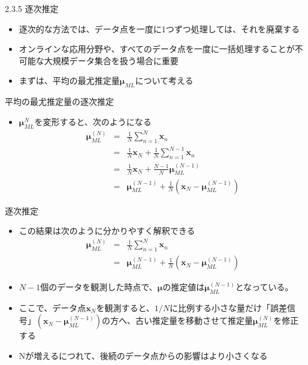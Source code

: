 \begin{frame}{2.3.5 逐次推定}
 \begin{itemize}
  \item 逐次的な方法では、データ点を一度に1つずつ処理しては、それを廃棄する
  \item オンラインな応用分野や、すべてのデータ点を一度に一括処理することが不可能な大規模データ集合を扱う場合に重要
  \item まずは、平均の最尤推定量$\bm{\mu}_{ML}$について考える
 \end{itemize}
\end{frame}

\begin{frame}{平均の最尤推定量の逐次推定}
 \begin{itemize}
  \item $\bm{\mu}_{ML}^{N}$を変形すると、次のようになる
        \begin{eqnarray}
         \bm{\mu}_{ML}^{(N)} &= &\frac{1}{N}\sum_{n=1}^{N}\bm{x}_n \nonumber \\
         & =& \frac{1}{N}\bm{x}_N+\frac{1}{N}\sum_{n=1}^{N-1}\bm{x}_n \nonumber \\
         & =& \frac{1}{N}\bm{x}_N + \frac{N-1}{N}\bm{\mu}_{ML}^{(N-1)}\nonumber \\
         & =& \bm{\mu}_{ML}^{(N-1)} +\frac{1}{N} (\bm{x}_N-\bm{\mu}_{ML}^{(N-1)})\label{162008_21Nov14}
        \end{eqnarray}
 \end{itemize}
\end{frame}

\begin{frame}{逐次推定}
 \begin{itemize}
  \item この結果は次のように分かりやすく解釈できる
        \begin{eqnarray}
         \bm{\mu}_{ML}^{(N)} &= &\frac{1}{N}\sum_{n=1}^{N}\bm{x}_n \\
         & =& \bm{\mu}_{ML}^{(N-1)} +\frac{1}{N} (\bm{x}_N-\bm{\mu}_{ML}^{(N-1)})
        \end{eqnarray}
  \item $N-1$個のデータを観測した時点で、$\bm{\mu}$の推定値は$\bm{\mu}_{ML}^{(N-1)}$となっている。
  \item ここで、データ点$\bm{x}_N$を観測すると、$1/N$に比例する小さな量だけ「誤差信号」$(\bm{x}_N-\bm{\mu}_{ML}^{(N-1)})$の方へ、古い推定量を移動させて推定量$\bm{\mu}_{ML}^{(N)}$を修正する
  \item Nが増えるにつれて、後続のデータ点からの影響はより小さくなる
 \end{itemize}
\end{frame}

